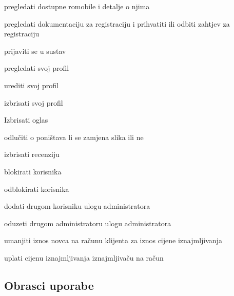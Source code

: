 \begin{packed_enum}
\begin{packed_enum}
			\end{packed_enum}
			\item  {}
			
			\begin{packed_enum}
		
			\item pregledati dostupne romobile i detalje o njima
			\item pregledati dokumentaciju za registraciju i prihvatiti ili odbiti zahtjev za registraciju
			\item prijaviti se u sustav
			\item pregledati svoj profil
			\item urediti svoj profil
			\item izbrisati svoj profil
			\item Izbrisati oglas
			\item odlučiti o poništava li se zamjena slika ili ne
			\item izbrisati recenziju
			\item blokirati korisnika
			\item odblokirati korisnika
			\item dodati drugom korisniku ulogu administratora
			\item oduzeti drugom administratoru ulogu administratora
			
			
		
			
			\end{packed_enum}
			\item  {}
			
			\item  {}
			
			\begin{packed_enum}
				
			\item umanjiti iznos novca na računu klijenta za iznos cijene iznajmljivanja
			
			\item uplati cijenu iznajmljivanja iznajmljivaču na račun
			
			
			
			\end{packed_enum}
		\end{packed_enum}
			
			\eject 
			
			
				
			\subsection{Obrasci uporabe}
				
